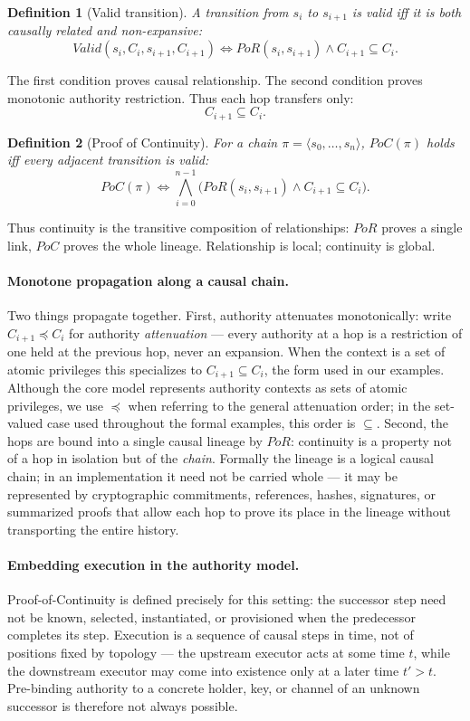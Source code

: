 \documentclass[11pt]{article}
\newtheorem{definition}{Definition}
\begin{document}
\begin{definition}[Valid transition]
A transition from $s_i$ to $s_{i+1}$ is valid iff it is both causally related
and non-expansive:
\[
Valid(s_i,C_i,s_{i+1},C_{i+1})
\Longleftrightarrow
PoR(s_i,s_{i+1}) \land C_{i+1}\subseteq C_i.
\]
\end{definition}

The first condition proves causal relationship.
The second condition proves monotonic authority restriction.
Thus each hop transfers only:
\[
C_{i+1} \subseteq C_i. \tag{C1}
\]

\begin{definition}[Proof of Continuity]
For a chain $\pi = \langle s_0, \dots, s_n \rangle$, $PoC(\pi)$ holds iff every
adjacent transition is valid:
\[
PoC(\pi) \Longleftrightarrow
\bigwedge_{i=0}^{n-1} \big( PoR(s_i, s_{i+1}) \land C_{i+1} \subseteq C_i \big).
\]
\end{definition}

Thus continuity is the transitive composition of relationships: $PoR$ proves a
single link, $PoC$ proves the whole lineage. Relationship is local; continuity
is global.

\paragraph{Monotone propagation along a causal chain.}
Two things propagate together. First, authority attenuates monotonically: write
$C_{i+1} \preceq C_i$ for authority \emph{attenuation} --- every authority at a
hop is a restriction of one held at the previous hop, never an expansion. When
the context is a set of atomic privileges this specializes to
$C_{i+1} \subseteq C_i$, the form used in our examples. Although the core model
represents authority contexts as sets of atomic privileges, we use $\preceq$ when
referring to the general attenuation order; in the set-valued case used
throughout the formal examples, this order is $\subseteq$. Second, the hops are
bound into a single causal lineage by $PoR$: continuity is a property not of a
hop in isolation but of the \emph{chain}. Formally the lineage is a logical
causal chain; in an implementation it need not be carried whole --- it may be
represented by cryptographic commitments, references, hashes, signatures, or
summarized proofs that allow each hop to prove its place in the lineage without
transporting the entire history.

\paragraph{Embedding execution in the authority model.}
Proof-of-Continuity is defined precisely for this setting: the successor step need
not be known, selected, instantiated, or provisioned when the predecessor
completes its step. Execution is a sequence of causal steps in time, not of
positions fixed by topology --- the upstream executor acts at some time $t$, while
the downstream executor may come into existence only at a later time $t' > t$.
Pre-binding authority to a concrete holder, key, or channel of an unknown
successor is therefore not always possible.
\end{document}
